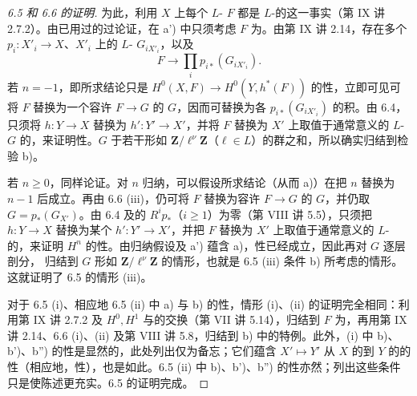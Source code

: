 \begin{proof}[6.5 和 6.6 的证明]
为此，利用 $X$ 上每个 $L$- $F$ 都是 $L$-的这一事实（第 IX 讲 2.7.2）。由已用过的过论证，在 a') 中只须考虑 $F$ 为。由第 IX 讲 2.14，存在多个 $p_i:X'_i\to X$、$X'_i$ 上的 $L$- $G_{iX'_i}$，以及
\[
F\longrightarrow\prod_i p_{i*}(G_{iX'_i}).
\]
若 $n=-1$，即所求结论只是 $H^0(X,F)\to H^0(Y,h^*(F))$ 的性，立即可见可将 $F$ 替换为一个容许 $F\to G$ 的 $G$，因而可替换为各 $p_{i*}(G_{iX'_i})$ 的积。由 6.4，只须将 $h:Y\to X$ 替换为 $h':Y'\to X'$，并将 $F$ 替换为 $X'$ 上取值于通常意义的 $L$- $G$ 的，来证明性。$G$ 于若干形如 $\mathbf Z/\ell^\nu\mathbf Z$（$\ell\in L$）的群之和，所以确实归结到检验 b)。

若 $n\geq0$，同样论证。对 $n$ 归纳，可以假设所求结论（从而 a)）在把 $n$ 替换为 $n-1$ 后成立。再由 6.6 (iii)，仍可将 $F$ 替换为容许 $F\to G$ 的 $G$，并仍取 $G=p_*(G_{X'})$。由 6.4 及的 $R^ip_*$（$i\geq1$）为零（第 VIII 讲 5.5），只须把 $h:Y\to X$ 替换为某个 $h':Y'\to X'$，并把 $F$ 替换为 $X'$ 上取值于通常意义的 $L$-的，来证明 $H^n$ 的性。由归纳假设及 a') 蕴含 a)，性已经成立，因此再对 $G$ 逐层剖分，
归结到 $G$ 形如 $\mathbf Z/\ell^\nu\mathbf Z$ 的情形，也就是 6.5 (iii) 条件 b) 所考虑的情形。这就证明了 6.5 的情形 (iii)。

对于 6.5 (i)、相应地 6.5 (ii) 中 a) 与 b) 的性，情形 (i)、(ii) 的证明完全相同：利用第 IX 讲 2.7.2 及 $H^0,H^1$ 与的交换（第 VII 讲 5.14），归结到 $F$ 为，再用第 IX 讲 2.14、6.6 (i)、(ii) 及第 VIII 讲 5.8，归结到 b) 中的特例。此外，(i) 中 b)、b')、b'') 的性是显然的，此处列出仅为备忘；它们蕴含 $X'\mapsto Y'$ 从 $X$ 的到 $Y$ 的的性（相应地，性），也是如此。6.5 (ii) 中 b)、b')、b'') 的性亦然；列出这些条件只是使陈述更充实。6.5 的证明完成。
\end{proof}

